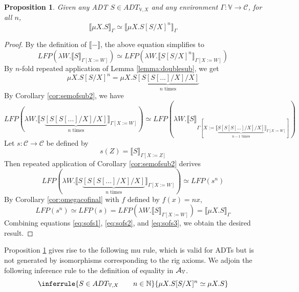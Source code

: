 \documentclass{msthesis}
\newtheorem{prop}[theorem]{Proposition}
\theoremstyle{definition}
\newcommand{\semof}[1]{\llbracket{#1}\rrbracket}
\newcommand{\nat}{\mathbb{N}}
\newcommand{\mcC}{\mathcal{C}}
\newcommand{\vars}{\mathbb{V}}
\begin{document}
\begin{prop}\label{prop:sofs}
    Given any ADT $S \in ADT_{\vars,X}$ and any environment $\Gamma : \vars \to \mcC$, for all $n$,
    \[ \semof{\mu X.S}_\Gamma \simeq \semof{\mu X. S[S/X]^n}_\Gamma \]
\end{prop}
\begin{proof}
    By the definition of $\semof{-}$, the above equation simplifies to
    \[ LFP(\lambda W. \semof{S}_{\Gamma[X:= W]}) \simeq LFP(\lambda W. \semof{S[S/X]^n}_{\Gamma[X:=W]}) \]
    By $n$-fold repeated application of Lemma \ref{lemma:doublesub}, we get
    \begin{equation}\label{eq:sofs1}
        \mu X.S[S/X]^n = \mu X.S\underbrace{[S[S[...]/X]/X]}_{\text{$n$ times}}
    \end{equation}
    By Corollary \ref{cor:semofsub2}, we have
    \begin{equation*}
        LFP(\lambda W. \semof{S\underbrace{[S[S[...]/X]/X]}_{\text{$n$ times}}}_{\Gamma[X:=W]}) \simeq LFP(\lambda W. \semof{S}_{\Gamma[X:=\semof{\underbrace{ S[S[S[...]/X]/X]}_{\text{$n-1$  times}}}_{\Gamma[X:=W]}]})
    \end{equation*}
    Let $s : \mcC \to \mcC$ be defined by
    \[ s(Z) = \semof{S}_{\Gamma[X := Z]} \]
    Then repeated application of Corollary \ref{cor:semofsub2} derives
    \begin{equation}\label{eq:sofs2}
        LFP(\lambda W. \semof{S \underbrace{[S[S[...]/X]/X]}_{\text{$n$ times}}}_{\Gamma[X:=W]}) \simeq LFP(s^n) 
    \end{equation}
    By Corollary \ref{cor:omegacofinal} with $f$ defined by $f(x) = nx$, 
    \begin{equation}\label{eq:sofs3}
        LFP(s^n) \simeq LFP(s) = LFP(\lambda W.\semof{S}_{\Gamma[X := W]}) = \semof{\mu X.S}_\Gamma
    \end{equation}
    Combining equations \eqref{eq:sofs1},  \eqref{eq:sofs2}, and \eqref{eq:sofs3}, we obtain the desired result.
\end{proof}

Proposition \ref{prop:sofs} gives rise to the following mu rule, which is valid for ADTs but is not generated by isomorphisms corresponding to the rig axioms.
We adjoin the following inference rule to the definition of equality in $\ADTrig$.
\begin{equation}\label{eq:sofsinfer}
    \inferrule{S \in ADT_{\vars,X} \qquad n \in \nat}{\mu X.S[S/X]^n \simeq \mu X.S}
\end{equation}
\end{document}
